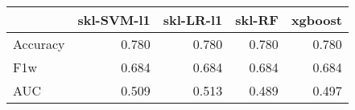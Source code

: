 \begin{tabular}{lrrrr}
\toprule
{} &  skl-SVM-l1 &  skl-LR-l1 &  skl-RF &  xgboost \\
\midrule
Accuracy &       0.780 &      0.780 &   0.780 &    0.780 \\
F1w      &       0.684 &      0.684 &   0.684 &    0.684 \\
AUC      &       0.509 &      0.513 &   0.489 &    0.497 \\
\bottomrule
\end{tabular}
